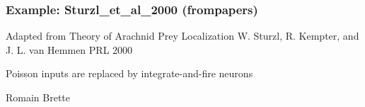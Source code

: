 \documentclass[letterpaper,10pt,english]{manual}
\begin{document}
\resetcurrentobjects
\hypertarget{--doc-examples-frompapers_Sturzl_et_al_2000}{}

\hypertarget{index-44}{}\subsubsection{Example: Sturzl\_et\_al\_2000 (frompapers)}

Adapted from
Theory of Arachnid Prey Localization
W. Sturzl, R. Kempter, and J. L. van Hemmen
PRL 2000

Poisson inputs are replaced by integrate-and-fire neurons

Romain Brette
\end{document}
